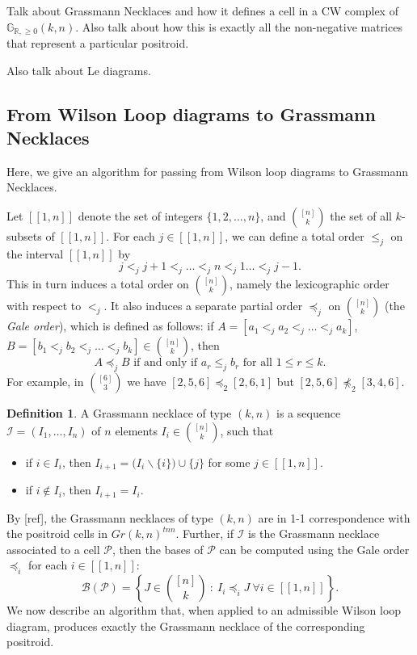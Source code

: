 \documentclass[11pt]{article}
\newcommand{\R}{\mathbb{R}}
\newcommand{\Gr}{\mathbb{G}_{\R, \geq 0}}
\newcommand{\II}{\mathcal{I}}
\newcommand{\PP}{\mathcal{P}}
\newcommand{\BB}{\mathcal{B}}
\newcommand{\interval}[2]{[\![#1,#2]\!]}
\newcommand{\gale}[1]{\preccurlyeq_{#1}}
\theoremstyle{remark}
\theoremstyle{definition}
\newtheorem{dfn}[thm]{Definition}
\begin{document}
Talk about Grassmann Necklaces and how it defines a cell in a CW complex of $\Gr(k,n)$. Also talk about how this is exactly all the non-negative matrices that represent a particular positroid.

Also talk about Le diagrams.

\subsection{From Wilson Loop diagrams to Grassmann Necklaces}

Here, we give an algorithm for passing from Wilson loop diagrams to Grassmann Necklaces.

Let $\interval{1}{n}$ denote the set of integers $\{1,2, \dots, n\}$, and $\binom{[n]}{k}$ the set of all $k$-subsets of $\interval{1}{n}$.  For each $j \in \interval{1}{n}$, we can define a total order $\leq_j$ on the interval $\interval{1}{n}$ by
\[ j <_j j+1 <_j \dots <_j n <_j 1 \dots <_j j-1.\]
This in turn induces a total order on $\binom{[n]}{k}$, namely the lexicographic order with respect to $<_j$.  It also induces a separate partial order $\gale{j}$ on $\binom{[n]}{k}$ (the \textit{Gale order}), which is defined as follows: if $A = [a_1 <_j a_2 <_j \dots <_j a_k]$,  $B = [b_1 <_j b_2 <_j \dots <_j b_k] \in \binom{[n]}{k}$, then
\[A \gale{j} B \text{ if and only if } a_r \leq_j b_r \text{ for all }1 \leq r \leq k.\]
For example, in $\binom{[6]}{3}$ we have $[2,5,6]\gale{2} [2,6,1]$ but $[2,5,6]\not\gale{2}[3,4,6]$.


\begin{dfn}\label{def:grassmann necklace}
A Grassmann necklace of type $(k,n)$ is a sequence $\II = (I_1, \dots, I_n)$ of $n$ elements $I_i \in \binom{[n]}{k}$, such that
\begin{itemize}
\item if $i \in I_i$, then $I_{i+1} = \big(I_i \backslash \{i\}\big) \cup \{j\}$ for some $j \in \interval{1}{n}$.
\item if $i \not\in I_i$, then $I_{i+1} = I_i$.
\end{itemize}
\end{dfn}

By [ref], the Grassmann necklaces of type $(k,n)$ are in 1-1 correspondence with the positroid cells in $Gr(k,n)^{tnn}$.  Further, if $\II$ is the Grassmann necklace associated to a cell $\PP$, then the bases of $\PP$ can be computed using the Gale order $\gale{i}$ for each $i \in \interval{1}{n}$:
\[\BB(\PP) = \left\{J \in \binom{[n]}{k}\ :\ I_i \gale{i} J \ \forall i \in \interval{1}{n}\right\}.\]
We now describe an algorithm that, when applied to an admissible Wilson loop diagram, produces exactly the Grassmann necklace of the corresponding positroid.
\end{document}

